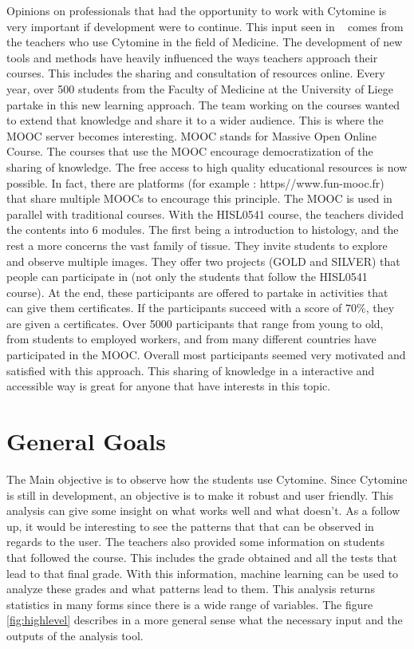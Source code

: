 \documentclass[a4paper,11pt]{report}
\numberwithin{figure}{chapter} %
\begin{document}
    Opinions on professionals that had the opportunity to work with Cytomine is very important if development were to continue.
    This input seen in ~\cite{hist} comes from the teachers who use Cytomine in the field of Medicine.
    The development of new tools and methods have heavily influenced the ways teachers approach their courses.
    This includes the sharing and consultation of resources online.
    Every year, over 500 students from the Faculty of Medicine at the University of Liege partake in this new learning approach.
    The team working on the courses wanted to extend that knowledge and share it to a wider audience.
    This is where the MOOC server becomes interesting.
    MOOC stands for Massive Open Online Course.
    The courses that use the MOOC encourage democratization of the sharing of knowledge.
    The free access to high quality educational resources is now possible.
    In fact, there are platforms (for example : https//www.fun-mooc.fr) that share multiple MOOCs to encourage this principle.
    The MOOC is used in parallel with traditional courses.
    With the HISL0541 course, the teachers divided the contents into 6 modules.
    The first being a introduction to histology, and the rest a more concerns the vast family of tissue.
    They invite students to explore and observe multiple images.
    They offer two projects (GOLD and SILVER) that people can participate in (not only the students that follow the HISL0541 course).
    At the end, these participants are offered to partake in activities that can give them certificates.
    If the participants succeed with a score of 70\%, they are given a certificates.
    Over 5000 participants that range from young to old, from students to employed workers, and from many different countries have participated in the MOOC.
    Overall most participants seemed very motivated and satisfied with this approach.
    This sharing of knowledge in a interactive and accessible way is great for anyone that have interests in this topic.


\section{General Goals}


    The Main objective is to observe how the students use Cytomine.
    Since Cytomine is still in development, an objective is to make it robust and user friendly.
    This analysis can give some insight on what works well and what doesn't.
    As a follow up, it would be interesting to see the patterns that that can be observed in regards to the user.
    The teachers also provided some information on students that followed the course.
    This includes the grade obtained and all the tests that lead to that final grade.
    With this information, machine learning can be used to analyze these grades and what patterns lead to them.
    This analysis returns statistics in many forms since there is a wide range of variables.
    The figure \ref{fig:highlevel} describes in a more general sense what the necessary input and the outputs of the analysis tool.
\end{document}
